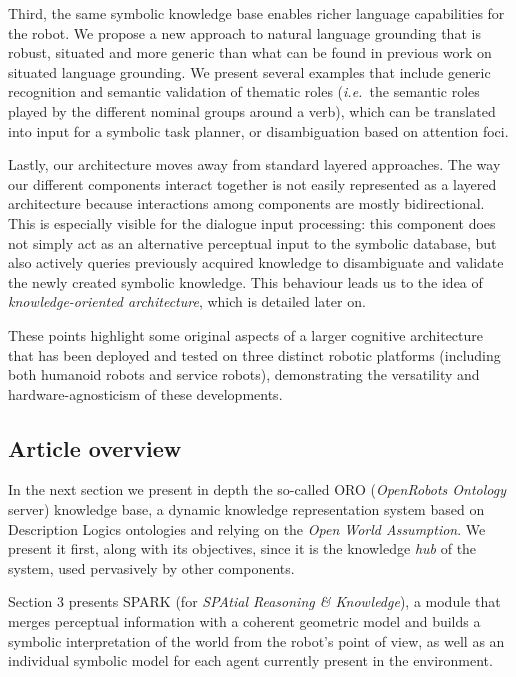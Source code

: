 \documentclass[twocolumn]{svjour3}
\newcommand{\ie}{{\textit{i.e.~}}}
\begin{document}
Third, the same symbolic knowledge base enables richer language capabilities
for the robot.  We propose a new approach to natural language grounding that is
robust, situated and more generic than what can be found in previous work
on situated language grounding. We present several examples that include
generic recognition and semantic validation of thematic roles (\ie the
semantic roles played by the different nominal groups around a verb), which
can be translated into input for a symbolic task planner, or disambiguation
based on attention foci.

Lastly, our architecture moves away from standard layered approaches. The way
our different components interact together is not easily represented as a
layered architecture because interactions among components are mostly
bidirectional.  This is especially visible for the dialogue input processing:
this component does not simply act as an alternative perceptual input to the
symbolic database, but also actively queries previously acquired knowledge to
disambiguate and validate the newly created symbolic knowledge. This behaviour
leads us to the idea of \emph{knowledge-oriented architecture}, which is
detailed later on.

These points highlight some original aspects of a larger cognitive architecture
that has been deployed and tested on three distinct robotic platforms
(including both humanoid robots and service robots), demonstrating the
versatility and hardware-agnosticism of these developments.

\subsection{Article overview}

In the next section we present in depth the so-called {\sc ORO}
(\emph{OpenRobots Ontology} server) knowledge base, a dynamic knowledge
representation system based on Description Logics ontologies and relying on the
\emph{Open World Assumption}. We present it first, along with its objectives,
since it is the knowledge \textit{hub} of the system, used pervasively by other
components.

Section 3 presents {\sc SPARK} (for \emph{SPAtial Reasoning \& Knowledge}), a
module that merges perceptual information with a coherent geometric model and
builds a symbolic interpretation of the world from the robot's point of view,
as well as an individual symbolic model for each agent currently present in the
environment. 
\end{document}

